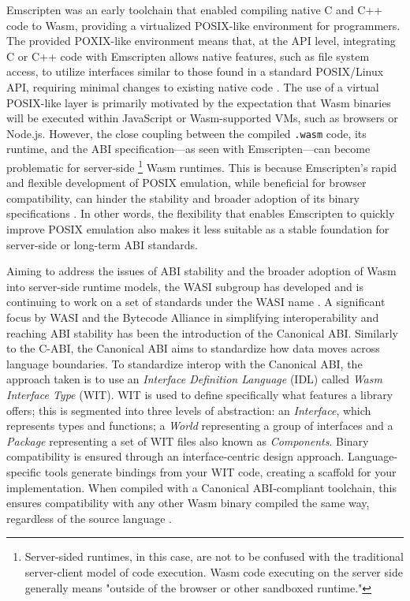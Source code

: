 Emscripten was an early toolchain that enabled compiling native C and C++ code to Wasm, providing a virtualized POSIX-like environment for programmers. The provided POXIX-like environment means that, at the API level, integrating C or C++ code with Emscripten allows native features, such as file system access, to utilize interfaces similar to those found in a standard POSIX/Linux API, requiring minimal changes to existing native code \cite{emscripten_fs_overview}. The use of a virtual POSIX-like layer is primarily motivated by the expectation that Wasm binaries will be executed within JavaScript or Wasm-supported VMs, such as browsers or Node.js. However, the close coupling between the compiled \texttt{.wasm} code, its runtime, and the ABI specification—as seen with Emscripten—can become problematic for server-side \footnote{Server-sided runtimes, in this case, are not to be confused with the traditional server-client model of code execution. Wasm code executing on the server side generally means "outside of the browser or other sandboxed runtime."} Wasm runtimes. This is because Emscripten's rapid and flexible development of POSIX emulation, while beneficial for browser compatibility, can hinder the stability and broader adoption of its binary specifications \cite{Akbary2023wasienv, akbary_wasienv_2019}. In other words, the flexibility that enables Emscripten to quickly improve POSIX emulation also makes it less suitable as a stable foundation for server-side or long-term ABI standards. 

Aiming to address the issues of ABI stability and the broader adoption of Wasm into server-side runtime models, the WASI subgroup has developed and is continuing to work on a set of standards under the WASI name \cite{wasi_dev}. A significant focus by WASI and the Bytecode Alliance in simplifying interoperability and reaching ABI stability has been the introduction of the Canonical ABI. Similarly to the C-ABI, the Canonical ABI aims to standardize how data moves across language boundaries. To standardize interop with the Canonical ABI, the approach taken is to use an \textit{Interface Definition Language} (IDL) called \textit{Wasm Interface Type} (WIT). WIT is used to define specifically what features a library offers; this is segmented into three levels of abstraction: an \textit{Interface}, which represents types and functions; a \textit{World} representing a group of interfaces and a \textit{Package} representing a set of WIT files also known as \textit{Components}. Binary compatibility is ensured through an interface-centric design approach. Language-specific tools generate bindings from your WIT code, creating a scaffold for your implementation. When compiled with a Canonical ABI-compliant toolchain, this ensures compatibility with any other Wasm binary compiled the same way, regardless of the source language \cite{bytecodealliance_component_model_concepts}. 

